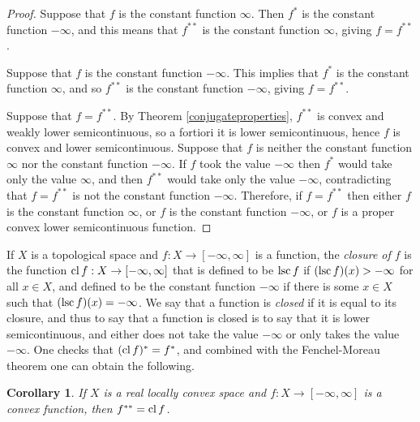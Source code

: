 \documentclass{article}
\newcommand{\lsc}{\ensuremath\mathrm{lsc}\,}
\newcommand{\cl}{\ensuremath\mathrm{cl}\,}
\newtheorem{corollary}[theorem]{Corollary}
\theoremstyle{definition}
\begin{document}
\begin{proof}
Suppose that $f$ is the constant function $\infty$. Then $f^*$ is the constant function $-\infty$, and this means that $f^{**}$
is the constant function $\infty$, giving $f=f^{**}$.

Suppose that $f$ is the constant function $-\infty$. This implies that $f^*$ is the constant function $\infty$, and so
$f^{**}$ is the constant function $-\infty$, giving $f=f^{**}$.

Suppose that $f=f^{**}$. By Theorem \ref{conjugateproperties}, $f^{**}$ is convex and weakly lower semicontinuous, so a fortiori it is lower semicontinuous, 
hence $f$ is convex and lower semicontinuous.
Suppose that $f$ is neither the constant function
$\infty$ nor the constant function $-\infty$. 
If $f$ took the value $-\infty$ then $f^*$ would take
only the value $\infty$, and then $f^{**}$ would take only the value $-\infty$, contradicting that $f=f^{**}$ is not the constant function
$-\infty$. 
Therefore, if $f=f^{**}$ then either $f$ is the constant function $\infty$, or $f$ is the constant function $-\infty$, or $f$ is a proper convex 
 lower
semicontinuous function.
\end{proof}



If $X$ is a topological space and $f:X \to [-\infty,\infty]$ is a function, the {\em closure of $f$} is the function $\cl f:X \to [-\infty,\infty]$ that is defined to be
$\lsc f$ if $(\lsc f)(x)>-\infty$ for all $x \in X$, and  defined to be the constant function $-\infty$ if there is some $x \in X$ such that $(\lsc f)(x)=-\infty$.
We say that a function is {\em closed} if it is equal to its closure, and thus
 to say that a function is closed is to say that it is lower semicontinuous, and 
 either does not take the value $-\infty$ or only takes the value $-\infty$. One checks that $(\cl f)^*=f^*$, and combined with the Fenchel-Moreau theorem one
 can obtain the following.


\begin{corollary}
If $X$ is a real locally convex space and $f:X \to [-\infty,\infty]$ is a convex function, then $f^{**}=\cl f$.
\end{corollary}
\end{document}
